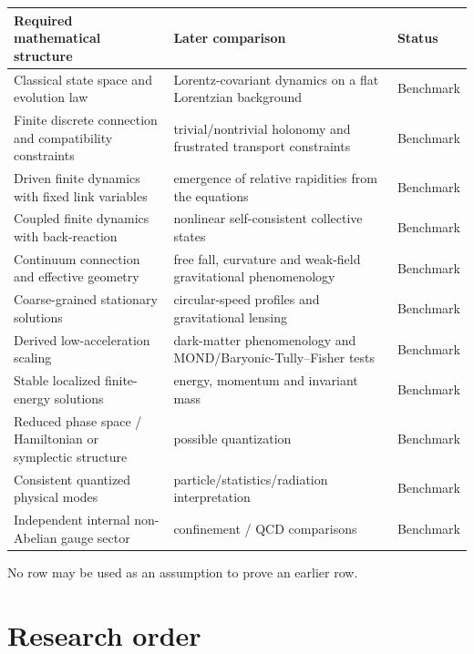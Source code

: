 \documentclass[11pt,a4paper]{article}
\theoremstyle{remark}
\newcommand{\statusBenchmark}{\textsf{Benchmark}}
\begin{document}
\begin{center}
\small
\begin{tabularx}{\textwidth}{@{}L{0.31\textwidth}L{0.29\textwidth}X@{}}
\toprule
Required mathematical structure & Later comparison & Status \\
\midrule
Classical state space and evolution law & Lorentz-covariant dynamics on a flat Lorentzian background & \statusBenchmark \\
Finite discrete connection and compatibility constraints & trivial/nontrivial holonomy and frustrated transport constraints & \statusBenchmark \\
Driven finite dynamics with fixed link variables & emergence of relative rapidities from the equations & \statusBenchmark \\
Coupled finite dynamics with back-reaction & nonlinear self-consistent collective states & \statusBenchmark \\
Continuum connection and effective geometry & free fall, curvature and weak-field gravitational phenomenology & \statusBenchmark \\
Coarse-grained stationary solutions & circular-speed profiles and gravitational lensing & \statusBenchmark \\
Derived low-acceleration scaling & dark-matter phenomenology and MOND/Baryonic-Tully--Fisher tests & \statusBenchmark \\
Stable localized finite-energy solutions & energy, momentum and invariant mass & \statusBenchmark \\
Reduced phase space / Hamiltonian or symplectic structure & possible quantization & \statusBenchmark \\
Consistent quantized physical modes & particle/statistics/radiation interpretation & \statusBenchmark \\
Independent internal non-Abelian gauge sector & confinement / QCD comparisons & \statusBenchmark \\
\bottomrule
\end{tabularx}
\end{center}

No row may be used as an assumption to prove an earlier row.

\section{Research order}
\end{document}

